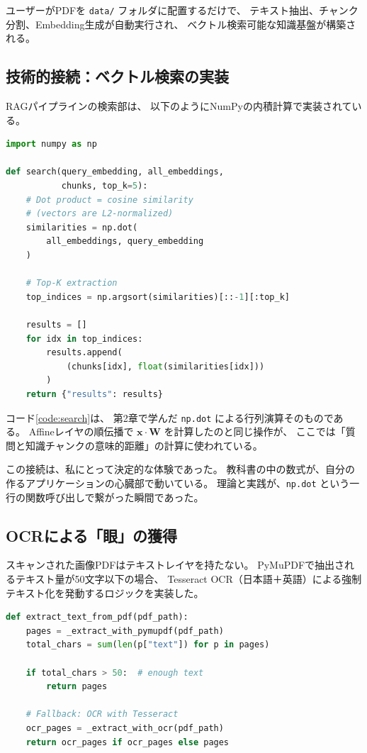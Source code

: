 \documentclass[uplatex, dvipdfmx, a4paper, 11pt]{jsarticle}
\begin{document}
ユーザーがPDFを \texttt{data/} フォルダに配置するだけで、
テキスト抽出、チャンク分割、Embedding生成が自動実行され、
ベクトル検索可能な知識基盤が構築される。

\subsection{技術的接続：ベクトル検索の実装}
RAGパイプラインの検索部は、
以下のようにNumPyの内積計算で実装されている。

\begin{lstlisting}[language=Python, caption=Vector Search via Dot Product, label=code:search]
import numpy as np

def search(query_embedding, all_embeddings,
           chunks, top_k=5):
    # Dot product = cosine similarity
    # (vectors are L2-normalized)
    similarities = np.dot(
        all_embeddings, query_embedding
    )

    # Top-K extraction
    top_indices = np.argsort(similarities)[::-1][:top_k]

    results = []
    for idx in top_indices:
        results.append(
            (chunks[idx], float(similarities[idx]))
        )
    return {"results": results}
\end{lstlisting}

コード\ref{code:search}は、
第2章で学んだ \texttt{np.dot} による行列演算そのものである。
Affineレイヤの順伝播で $\bm{x} \cdot \bm{W}$ を計算したのと同じ操作が、
ここでは「質問と知識チャンクの意味的距離」の計算に使われている。

この接続は、私にとって決定的な体験であった。
教科書の中の数式が、自分の作るアプリケーションの心臓部で動いている。
理論と実践が、\texttt{np.dot} という一行の関数呼び出しで繋がった瞬間であった。

\subsection{OCRによる「眼」の獲得}
スキャンされた画像PDFはテキストレイヤを持たない。
PyMuPDFで抽出されるテキスト量が50文字以下の場合、
Tesseract OCR（日本語＋英語）による強制テキスト化を発動するロジックを実装した。

\begin{lstlisting}[language=Python, caption=OCR Fallback Logic, label=code:ocr]
def extract_text_from_pdf(pdf_path):
    pages = _extract_with_pymupdf(pdf_path)
    total_chars = sum(len(p["text"]) for p in pages)

    if total_chars > 50:  # enough text
        return pages

    # Fallback: OCR with Tesseract
    ocr_pages = _extract_with_ocr(pdf_path)
    return ocr_pages if ocr_pages else pages
\end{lstlisting}
\end{document}
